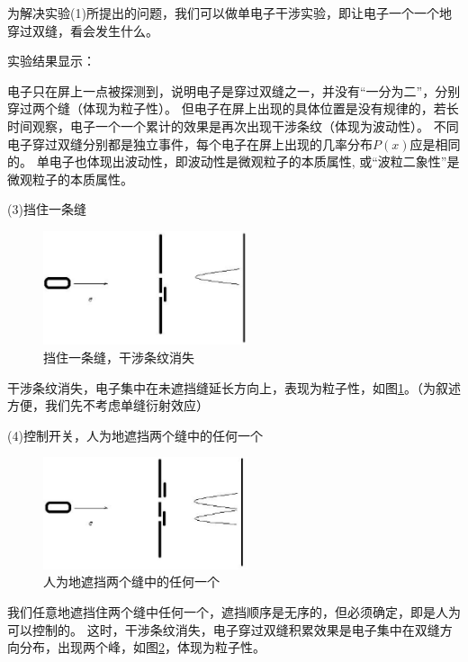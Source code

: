 为解决实验(1)所提出的问题，我们可以做单电子干涉实验，即让电子一个一个地穿过双缝，看会发生什么。

实验结果显示：

电子只在屏上一点被探测到，说明电子是穿过双缝之一，并没有``一分为二''，分别穿过两个缝（体现为粒子性）。
但电子在屏上出现的具体位置是没有规律的，若长时间观察，电子一个一个累计的效果是再次出现干涉条纹（体现为波动性）。
不同电子穿过双缝分别都是独立事件，每个电子在屏上出现的几率分布$P(x)$应是相同的。
单电子也体现出波动性，即波动性是微观粒子的本质属性,
或``波粒二象性''是微观粒子的本质属性。

(3)挡住一条缝

\begin{figure}[ht]
\begin{center}
\includegraphics[clip,width=6cm]{Duality/5-5.ps}
\caption{挡住一条缝，干涉条纹消失}\label{5-5-ps}
\end{center}
\end{figure}

干涉条纹消失，电子集中在未遮挡缝延长方向上，表现为粒子性，如图\ref{5-5-ps}。（为叙述方便，我们先不考虑单缝衍射效应）

(4)控制开关，人为地遮挡两个缝中的任何一个

\begin{figure}[ht]
\begin{center}
\includegraphics[clip,width=6cm]{Duality/5-6.ps}
\caption{人为地遮挡两个缝中的任何一个}\label{5-6-ps}
\end{center}
\end{figure}

我们任意地遮挡住两个缝中任何一个，遮挡顺序是无序的，但必须确定，即是人为可以控制的。
这时，干涉条纹消失，电子穿过双缝积累效果是电子集中在双缝方向分布，出现两个峰，如图\ref{5-6-ps}，体现为粒子性。

